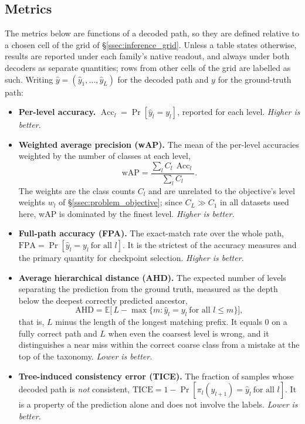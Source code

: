 \subsection{Metrics}
\label{ssec:inference_metrics}

The metrics below are functions of a decoded path, so they are defined relative to
a chosen cell of the grid of \S\ref{ssec:inference_grid}. Unless a table states
otherwise, results are reported under each family's native readout, and always
under both decoders as separate quantities; rows from other cells of the grid are
labelled as such. Writing $\hat y=(\hat y_1,\dots,\hat y_L)$ for the decoded path and
$y$ for the ground-truth path:

\begin{itemize}
    \item \textbf{Per-level accuracy.} $\operatorname{Acc}_l
    =\Pr[\hat y_l=y_l]$, reported for each level. \emph{Higher is better.}
    \item \textbf{Weighted average precision (wAP).} The mean of the per-level
    accuracies weighted by the number of classes at each level,
    \[
    \mathrm{wAP}=\frac{\sum_{l}C_l\,\operatorname{Acc}_l}{\sum_l C_l}.
    \]
    The weights are the class counts $C_l$ and are unrelated to the objective's
    level weights $w_l$ of \S\ref{ssec:problem_objective}; since $C_L\gg C_1$ in
    all datasets used here, wAP is dominated by the finest level.
    \emph{Higher is better.}
    \item \textbf{Full-path accuracy (FPA).} The exact-match rate over the whole
    path, $\mathrm{FPA}=\Pr[\hat y_l=y_l\ \text{for all }l]$. It is the strictest
    of the accuracy measures and the primary quantity for checkpoint selection.
    \emph{Higher is better.}
    \item \textbf{Average hierarchical distance (AHD).} The expected number of
    levels separating the prediction from the ground truth, measured as the depth
    below the deepest correctly predicted ancestor,
    \[
    \mathrm{AHD}=\mathbb{E}\Big[\,L-\max\{m: \hat y_l=y_l\ \text{for all } l\le m\}\Big],
    \]
    that is, $L$ minus the length of the longest matching prefix. It equals $0$ on
    a fully correct path and $L$ when even the coarsest level is wrong, and it
    distinguishes a near miss within the correct coarse class from a mistake at the
    top of the taxonomy. \emph{Lower is better.}
    \item \textbf{Tree-induced consistency error (TICE).} The fraction of samples
    whose decoded path is \emph{not} consistent,
    $\mathrm{TICE}=1-\Pr[\pi_l(\hat y_{l+1})=\hat y_l\ \text{for all }l]$. It is a
    property of the prediction alone and does not involve the labels.
    \emph{Lower is better.}
\end{itemize}

